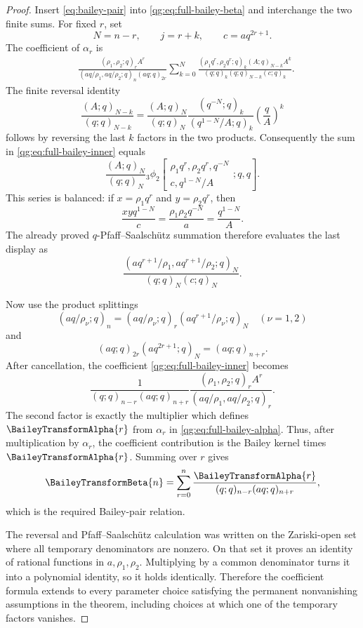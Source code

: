 \begin{proof}
Insert \eqref{eq:bailey-pair} into
\eqref{qg:eq:full-bailey-beta} and interchange the two finite sums.
For fixed \(r\), set
\[
  N=n-r,\qquad j=r+k,\qquad c=aq^{2r+1}.
\]
The coefficient of \(\alpha_r\) is
\begin{align}
 &\frac{(\rho_1,\rho_2;q)_rA^r}
 {(aq/\rho_1,aq/\rho_2;q)_n(aq;q)_{2r}}
 \sum_{k=0}^{N}
 \frac{(\rho_1q^r,\rho_2q^r;q)_k(A;q)_{N-k}A^k}
 {(q;q)_k(q;q)_{N-k}(c;q)_k}.
 \label{qg:eq:full-bailey-inner}
\end{align}
The finite reversal identity
\begin{equation}
 \frac{(A;q)_{N-k}}{(q;q)_{N-k}}
 =
 \frac{(A;q)_N}{(q;q)_N}
 \frac{(q^{-N};q)_k}{(q^{1-N}/A;q)_k}
 \left(\frac qA\right)^k
 \label{qg:eq:finite-reversal}
\end{equation}
follows by reversing the last \(k\) factors in the two products.
Consequently the sum in \eqref{qg:eq:full-bailey-inner} equals
\[
 \frac{(A;q)_N}{(q;q)_N}
 {}_3\phi_2\!\left[
 \begin{matrix}
   \rho_1q^r,\rho_2q^r,q^{-N}\\
   c,q^{1-N}/A
 \end{matrix};q,q
 \right].
\]
This series is balanced: if \(x=\rho_1q^r\) and
\(y=\rho_2q^r\), then
\[
  \frac{xyq^{1-N}}c
  =\frac{\rho_1\rho_2q^{-N}}a
  =\frac{q^{1-N}}A.
\]
The already proved \(q\)-Pfaff--Saalsch\"utz summation
 therefore evaluates the last display as
\begin{equation}
  \frac{(aq^{r+1}/\rho_1,aq^{r+1}/\rho_2;q)_N}
       {(q;q)_N(c;q)_N}.
  \label{qg:eq:full-bailey-inner-evaluation}
\end{equation}

Now use the product splittings
\[
 (aq/\rho_\nu;q)_n
 =(aq/\rho_\nu;q)_r(aq^{r+1}/\rho_\nu;q)_N
 \quad(\nu=1,2)
\]
and
\[
  (aq;q)_{2r}(aq^{2r+1};q)_N=(aq;q)_{n+r}.
\]
After cancellation, the coefficient
\eqref{qg:eq:full-bailey-inner} becomes
\[
 \frac{1}{(q;q)_{n-r}(aq;q)_{n+r}}
 \frac{(\rho_1,\rho_2;q)_rA^r}
      {(aq/\rho_1,aq/\rho_2;q)_r}.
\]
The second factor is exactly the multiplier which defines
\(\BaileyTransformAlpha{r}\) from \(\alpha_r\) in
\eqref{qg:eq:full-bailey-alpha}.  Thus, after multiplication by
\(\alpha_r\), the coefficient contribution is the Bailey kernel times
\(\BaileyTransformAlpha{r}\).  Summing over \(r\) gives
\[
  \BaileyTransformBeta{n}
  =\sum_{r=0}^{n}
    \frac{\BaileyTransformAlpha{r}}
         {(q;q)_{n-r}(aq;q)_{n+r}},
\]
which is the required Bailey-pair relation.

The reversal and Pfaff--Saalsch\"utz calculation was written on the
Zariski-open set where all temporary denominators are nonzero.  On that set
it proves an identity of rational functions in \(a,\rho_1,\rho_2\).
Multiplying by a common denominator turns it into a polynomial identity, so
it holds identically.  Therefore the coefficient formula extends to every
parameter choice satisfying the permanent nonvanishing assumptions in the
theorem, including choices at which one of the temporary factors vanishes.
\end{proof}

